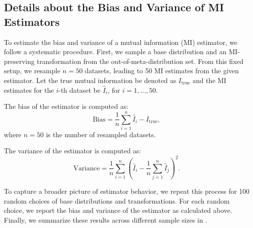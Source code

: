 \subsection{Details about the Bias and Variance of MI Estimators}
To estimate the bias and variance of a mutual information (MI) estimator, we follow a systematic procedure. First, we sample a base distribution and an MI-preserving transformation from the out-of-meta-distribution set. From this fixed setup, we resample \( n = 50 \) datasets, leading to 50 MI estimates from the given estimator. Let the true mutual information be denoted as \( I_\text{true} \) and the MI estimates for the \( i\)-th dataset be \( \hat{I}_i \), for \( i = 1, \dots, 50 \).

The bias of the estimator is computed as:
\begin{equation}
\text{Bias} = \frac{1}{n} \sum_{i=1}^{n} \hat{I}_i - I_\text{true},
\end{equation}
where \( n = 50 \) is the number of resampled datasets.

The variance of the estimator is computed as:
\begin{equation}
\text{Variance} = \frac{1}{n} \sum_{i=1}^{n} \left( \hat{I}_i - \frac{1}{n} \sum_{j=1}^{n} \hat{I}_j \right)^2.
\end{equation}

To capture a broader picture of estimator behavior, we repeat this process for 100 random choices of base distributions and transformations. For each random choice, we report the bias and variance of the estimator as calculated above. Finally, we summarize these results across different sample sizes in .


